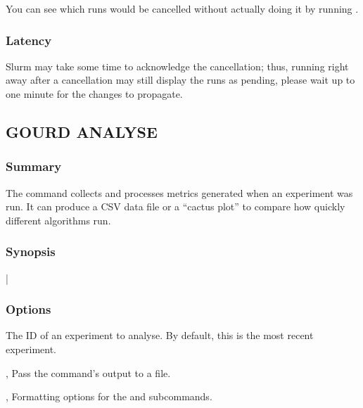 \documentclass[a4paper,english]{article}
\begin{document}
\begin{adjustwidth}{18pt}{0pt}
                You can see which runs would be cancelled without actually doing it
                by running    .

            \subsubsection{Latency}
                Slurm may take some time to acknowledge the cancellation; thus, running
                  right away after a cancellation may still display
                the runs as pending, please wait up to one minute for the changes to propagate.


        \subsection{GOURD ANALYSE}

            \subsubsection{Summary}
                The   command collects and processes metrics generated
                when an experiment was run. It can produce a CSV data file or a ``cactus plot''
                to compare how quickly different algorithms run.

            \subsubsection{Synopsis}
                 
                |

            \subsubsection{Options}
                \begin{Description}[Options]
                    \item[\Arg{experiment-id}]
                        The ID of an experiment to analyse.
                        By default, this is the most recent experiment.
                    \item[\OptArg{-o}{ path/to/file}, \OptArg{\ddash output}{ path/to/file}]
                        Pass the command's output to a file.
                    \item[\OptArg{-f}{ format options}, \OptArg{\ddash format}{ format options}]
                        Formatting options for the  and  subcommands.
                \end{Description}


\end{adjustwidth}
\end{document}
